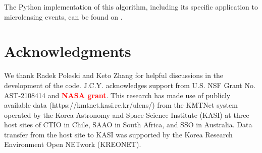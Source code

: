 \documentclass[preprint]{aastex631}
\newcommand{\HL}[1]{\textcolor{red}{\bf#1}}
\begin{document}
\vspace{12pt}
The Python implementation of this algorithm, including its specific application to microlensing events, can be found on .

\section*{Acknowledgments}

We thank Radek Poleski and Keto Zhang for helpful discussions in the development of the code.
J.C.Y. acknowledges support from U.S. NSF Grant No. AST-2108414 and \HL{NASA grant}. 
%
This research has made use of publicly available data 
(https://kmtnet.kasi.re.kr/ulens/) from the KMTNet system
operated by the Korea Astronomy and Space Science Institute
(KASI) at three host sites of CTIO in Chile, SAAO in South
Africa, and SSO in Australia. Data transfer from the host site to
KASI was supported by the Korea Research Environment
Open NETwork (KREONET).




\FloatBarrier
\newpage
\end{document}
